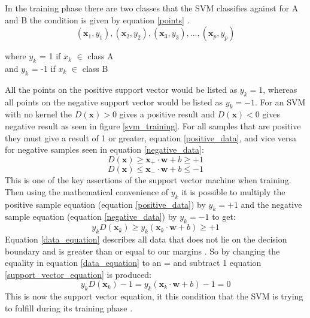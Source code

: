 \documentclass[12pt,a4paper]{article}
\begin{document}
In the training phase there are two classes that the SVM classifies against for A and B the condition is given by equation \ref{points} \cite{kernelSVMs1992}.
\begin{equation}
(\textbf{x}_1,y_1), (\textbf{x}_2,y_2), (\textbf{x}_3,y_3), ..., (\textbf{x}_p,y_p)
\label{points}
\end{equation}
\begin{center}
where $y_k$ = 1 if $x_k$ $\in$ class A\\ 
and   $y_k$ = -1 if $x_k$ $\in$ class B
\end{center} 
All the points on the positive support vector would be listed as $y_k = 1$, whereas all points on the negative support vector would be listed as $y_k = -1$. For an SVM with no kernel the $D(\textbf{x})  > 0$ gives a positive result and $D(\textbf{x})  < 0$ gives negative result as seen in figure \ref{svm_training}. For all samples that are positive they must give a result of 1 or greater, equation \ref{positive_data}, and vice versa for negative samples seen in equation \ref{negative_data}\cite{mitLecture}:
\begin{equation}
D(\textbf{x}) \geq \textbf{x$_+$} \cdot \textbf{w} + b \geq +1 
\label{positive_data}
\end{equation}
\begin{equation}
D(\textbf{x}) \leq \textbf{x$_-$} \cdot \textbf{w} + b \leq -1 
\label{negative_data}
\end{equation}
This is one of the key assertions of the support vector machine when training. Then using the mathematical convenience of $y_k$ it is possible to multiply the positive sample equation (equation \ref{positive_data}) by $y_k = +1$ and the negative sample equation (equation \ref{negative_data}) by $y_k = -1$ to get: 
\begin{equation}
y_k D(\textbf{x$_k$}) \geq y_k(\textbf{x$_k$} \cdot \textbf{w} + b) \geq +1 
\label{data_equation}
\end{equation}
Equation \ref{data_equation} describes all data that does not lie on the decision boundary and is greater than or equal to our margins \cite{mitLecture}. So by changing the equality in equation \ref{data_equation} to an = and subtract 1 equation \ref{support_vector_equation} is produced:
\begin{equation}
y_k D(\textbf{x$_k$}) -1 = y_k(\textbf{x$_k$} \cdot \textbf{w} + b) - 1 = 0
\label{support_vector_equation}
\end{equation}
This is now the support vector equation, it this condition that the SVM is trying to fulfill during its training phase \cite{mitLecture}.\\
\end{document}
